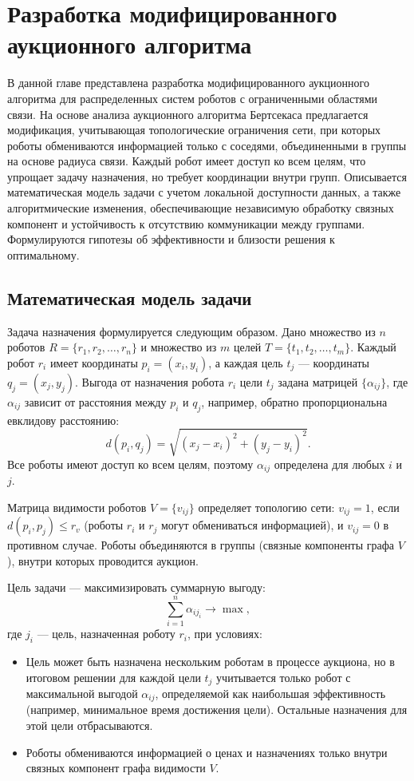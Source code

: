 \chapter{Разработка модифицированного аукционного алгоритма}
\label{ch2}

В данной главе представлена разработка модифицированного аукционного алгоритма для распределенных систем роботов с ограниченными областями связи. На основе анализа аукционного алгоритма Бертсекаса \cite{bertsekas1990} предлагается модификация, учитывающая топологические ограничения сети, при которых роботы обмениваются информацией только с соседями, объединенными в группы на основе радиуса связи. Каждый робот имеет доступ ко всем целям, что упрощает задачу назначения, но требует координации внутри групп. Описывается математическая модель задачи с учетом локальной доступности данных, а также алгоритмические изменения, обеспечивающие независимую обработку связных компонент и устойчивость к отсутствию коммуникации между группами. Формулируются гипотезы об эффективности и близости решения к оптимальному.

\section{Математическая модель задачи}

Задача назначения формулируется следующим образом. Дано множество из \( n \) роботов \( R = \{r_1, r_2, \ldots, r_n\} \) и множество из \( m \) целей \( T = \{t_1, t_2, \ldots, t_m\} \). Каждый робот \( r_i \) имеет координаты \( p_i = (x_i, y_i) \), а каждая цель \( t_j \) --- координаты \( q_j = (x_j, y_j) \). Выгода от назначения робота \( r_i \) цели \( t_j \) задана матрицей \( \{\alpha_{ij}\} \), где \( \alpha_{ij} \) зависит от расстояния между \( p_i \) и \( q_j \), например, обратно пропорциональна евклидову расстоянию:
\[
d(p_i, q_j) = \sqrt{(x_j - x_i)^2 + (y_j - y_i)^2}.
\]
Все роботы имеют доступ ко всем целям, поэтому \( \alpha_{ij} \) определена для любых \( i \) и \( j \).

Матрица видимости роботов \( V = \{v_{ij}\} \) определяет топологию сети: \( v_{ij} = 1 \), если \( d(p_i, p_j) \leq r_v \) (роботы \( r_i \) и \( r_j \) могут обмениваться информацией), и \( v_{ij} = 0 \) в противном случае. Роботы объединяются в группы (связные компоненты графа \( V \)), внутри которых проводится аукцион.

Цель задачи --- максимизировать суммарную выгоду:
\[
\sum_{i=1}^n \alpha_{i j_i} \to \max,
\]
где \( j_i \) --- цель, назначенная роботу \( r_i \), при условиях:
\begin{itemize}
    \item Цель может быть назначена нескольким роботам в процессе аукциона, но в итоговом решении для каждой цели \( t_j \) учитывается только робот с максимальной выгодой \( \alpha_{ij} \), определяемой как наибольшая эффективность (например, минимальное время достижения цели). Остальные назначения для этой цели отбрасываются.
    \item Роботы обмениваются информацией о ценах и назначениях только внутри связных компонент графа видимости \( V \).
\end{itemize}

